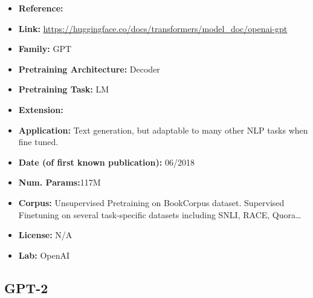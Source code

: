 \documentclass{article}
\begin{document}
            \begin{itemize}
                \item \textbf{Reference:} 
                \item \textbf{Link:} \url{https://huggingface.co/docs/transformers/model_doc/openai-gpt}
                \item \textbf{Family:} GPT 
                \item \textbf{Pretraining Architecture:} Decoder
                \item \textbf{Pretraining Task:} LM
                \item \textbf{Extension:}   
                \item \textbf{Application:} Text generation, but adaptable to many other NLP tasks when fine tuned.
                \item \textbf{Date (of first known publication):} 06/2018
                \item \textbf{Num. Params:}117M
                \item \textbf{Corpus:} Unsupervised Pretraining on BookCorpus dataset. Supervised Finetuning on several task-specific datasets including SNLI, RACE, Quora…
                \item \textbf{License:} N/A
                \item \textbf{Lab:} OpenAI
            \end{itemize}

\subsection{GPT-2}
\end{document}

